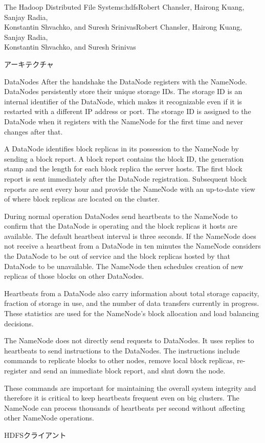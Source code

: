 \begin{aosachaptertoc}{The Hadoop Distributed File System}{s:hdfs}{Robert Chansler, Hairong Kuang, Sanjay Radia, \\ Konstantin Shvachko, and Suresh Srinivas}{Robert Chansler, Hairong Kuang, Sanjay Radia, \\ \hspace*{0.9cm} Konstantin Shvachko, and Suresh Srinivas}
\begin{aosasect1}{アーキテクチャ}
\begin{aosasect2}{DataNodes}
After the handshake the DataNode registers with the
NameNode. DataNodes persistently store their unique storage IDs. The
storage ID is an internal identifier of the DataNode, which makes it
recognizable even if it is restarted with a different IP address or
port. The storage ID is assigned to the DataNode when it registers
with the NameNode for the first time and never changes after that.

A DataNode identifies block replicas in its possession to the NameNode
by sending a block report. A block report contains the block ID, the
generation stamp and the length for each block replica the server
hosts. The first block report is sent immediately after the DataNode
registration. Subsequent block reports are sent every hour and provide
the NameNode with an up-to-date view of where block replicas are
located on the cluster.

During normal operation DataNodes send heartbeats to the NameNode to
confirm that the DataNode is operating and the block replicas it hosts
are available. The default heartbeat interval is three seconds. If the
NameNode does not receive a heartbeat from a DataNode in ten minutes
the NameNode considers the DataNode to be out of service and the block
replicas hosted by that DataNode to be unavailable. The NameNode then
schedules creation of new replicas of those blocks on other DataNodes.

Heartbeats from a DataNode also carry information about total storage
capacity, fraction of storage in use, and the number of data transfers
currently in progress. These statistics are used for the NameNode's
block allocation and load balancing decisions.

The NameNode does not directly send requests to DataNodes. It uses
replies to heartbeats to send instructions to the DataNodes.  The
instructions include commands to replicate blocks to other nodes,
remove local block replicas, re-register and send an immediate block
report, and shut down the node.

These commands are important for maintaining the overall system
integrity and therefore it is critical to keep heartbeats frequent
even on big clusters. The NameNode can process thousands of heartbeats
per second without affecting other NameNode operations.

\end{aosasect2}

\begin{aosasect2}{HDFSクライアント}


\end{aosasect2}
\end{aosasect1}
\end{aosachaptertoc}

